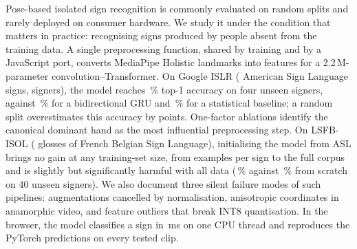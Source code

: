 Pose-based isolated sign recognition is commonly evaluated on random splits and rarely deployed on
consumer hardware. We study it under the condition that matters in practice: recognising signs
produced by people absent from the training data. A single preprocessing function, shared by
training and by a JavaScript port, converts MediaPipe Holistic landmarks into features for a
2.2\,M-parameter convolution--Transformer. On Google ISLR (\numAslClasses{} American Sign Language
signs, \numAslSigners{} signers), the model reaches \numTrTestTop{}\,\% top-1 accuracy on four
unseen signers, against \numGruTestTop{}\,\% for a bidirectional GRU and \numAslLogregTest{}\,\% for a statistical
baseline; a random split overestimates this accuracy by \numLeakGap{} points. One-factor ablations
identify the canonical dominant hand as the most influential preprocessing step. On LSFB-ISOL
(\numLsfbClasses{} glosses of French Belgian Sign Language), initialising the model from ASL brings
no gain at any training-set size, from \numLcMin{} examples per sign to the full corpus
and is slightly but significantly harmful with all data (\numLsfbFtTest{}\,\% against
\numLsfbScratchTest{}\,\% from scratch on 40 unseen signers). We also
document three silent failure modes of such pipelines: augmentations cancelled by normalisation,
anisotropic coordinates in anamorphic video, and feature outliers that break INT8 quantisation.
In the browser, the model classifies a sign in \numFpBrowser{}\,ms on one CPU thread and
reproduces the PyTorch predictions on every tested clip.
